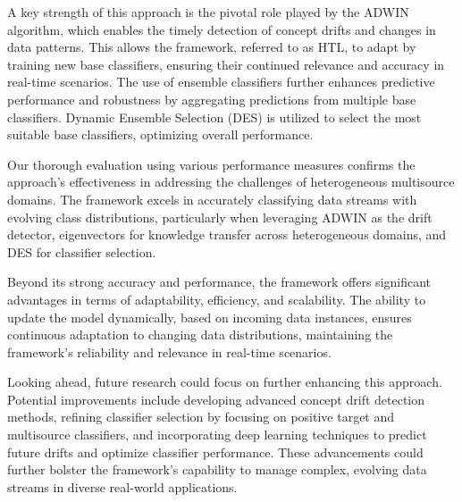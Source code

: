 A key strength of this approach is the pivotal role played by the ADWIN algorithm, which enables the timely detection of concept drifts and changes in data patterns. This allows the framework, referred to as HTL, to adapt by training new base classifiers, ensuring their continued relevance and accuracy in real-time scenarios. The use of ensemble classifiers further enhances predictive performance and robustness by aggregating predictions from multiple base classifiers. Dynamic Ensemble Selection (DES) is utilized to select the most suitable base classifiers, optimizing overall performance.

Our thorough evaluation using various performance measures confirms the approach’s effectiveness in addressing the challenges of heterogeneous multisource domains. The framework excels in accurately classifying data streams with evolving class distributions, particularly when leveraging ADWIN as the drift detector, eigenvectors for knowledge transfer across heterogeneous domains, and DES for classifier selection.

Beyond its strong accuracy and performance, the framework offers significant advantages in terms of adaptability, efficiency, and scalability. The ability to update the model dynamically, based on incoming data instances, ensures continuous adaptation to changing data distributions, maintaining the framework's reliability and relevance in real-time scenarios.

Looking ahead, future research could focus on further enhancing this approach. Potential improvements include developing advanced concept drift detection methods, refining classifier selection by focusing on positive target and multisource classifiers, and incorporating deep learning techniques to predict future drifts and optimize classifier performance. These advancements could further bolster the framework’s capability to manage complex, evolving data streams in diverse real-world applications.